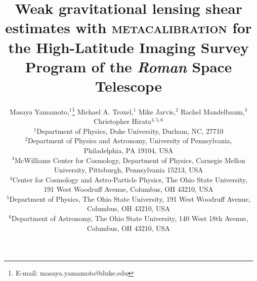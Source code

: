 {%
\usepackage{indentfirst}
\usepackage{physics}
\usepackage{lineno}
\linenumbers
\usepackage{ulem}
\usepackage{graphicx}	%
\usepackage{amsmath}	%
\usepackage{amssymb}	%
\usepackage{xcolor}





\normalem
\title[Metacalibration with Roman High-Latitude Imaging Survey]{Weak gravitational lensing shear estimates with \textsc{metacalibration} for the High-Latitude Imaging Survey Program of the \emph{Roman} Space Telescope}

\author[M. Yamamoto et al.]{
Masaya Yamamoto,$^{1}$\thanks{E-mail: masaya.yamamoto@duke.edu}
Michael A. Troxel,$^{1}$
Mike Jarvis,$^{2}$
Rachel Mandelbaum,$^{3}$
Christopher Hirata$^{4,5,6}$
\\
$^{1}$Department of Physics, Duke University, Durham, NC, 27710\\
$^{2}$Department of Physics and Astronomy, University of Pennsylvania, Philadelphia, PA 19104, USA\\
$^{3}$McWilliams Center for Cosmology, Department of Physics, Carnegie Mellon University, Pittsburgh, Pennsylvania 15213, USA\\
$^{4}$Center for Cosmology and Astro-Particle Physics, The Ohio State University, 191 West Woodruff Avenue, Columbus, OH 43210, USA\\
$^{5}$Department of Physics, The Ohio State University, 191 West Woodruff Avenue, Columbus, OH 43210, USA\\
$^{6}$Department of Astronomy, The Ohio State University, 140 West 18th Avenue, Columbus, OH 43210, USA\\
}

}
